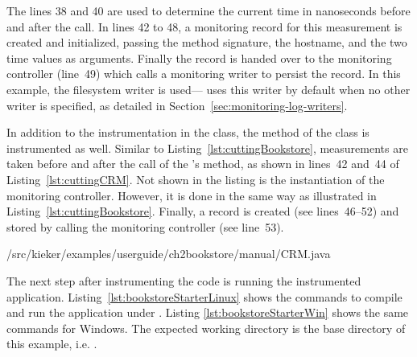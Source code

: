 \noindent The lines 38 and 40 are used to determine the current time in nanoseconds before and after the  call. In lines 42 to 48, a monitoring record for this measurement is created and initialized, passing the method signature, the hostname, and the two time values as arguments. Finally the record is handed over to the monitoring controller (line~49) which calls a monitoring writer to persist the record. %
In this example, the filesystem writer is used---\Kieker{} uses this writer by default when no other writer is specified, %
as detailed in Section~\ref{sec:monitoring-log-writers}. %

In addition to the instrumentation in the  class, the  method of the  class is instrumented as well. Similar to Listing~\ref{lst:cuttingBookstore}, measurements are taken before and after the call of the 's  method, as shown in %
lines~42 and~44 of Listing~\ref{lst:cuttingCRM}. Not shown in the listing is the instantiation of the monitoring controller. However, it is done in the same way as illustrated in Listing~\ref{lst:cuttingBookstore}. %
Finally, a record is created (see lines~46--52) and stored by calling the monitoring controller (see line~53).

\setJavaCodeListing
%
{\manualInstrumentedBookstoreApplicationDir/src/kieker/examples/userguide/ch2bookstore/manual/CRM.java}


\noindent %
The next step after instrumenting the code is running the instrumented application. Listing~\ref{lst:bookstoreStarterLinux} shows the commands to compile and run the application under \UnixLikeSystems{}. Listing \ref{lst:bookstoreStarterWin} shows the same commands for Windows. The expected working directory is the base directory of this example, i.e. %
 \dir{\manualInstrumentedBookstoreApplicationDirDistro{}/}.

\enlargethispage{1cm}

\setBashListing 		
	



